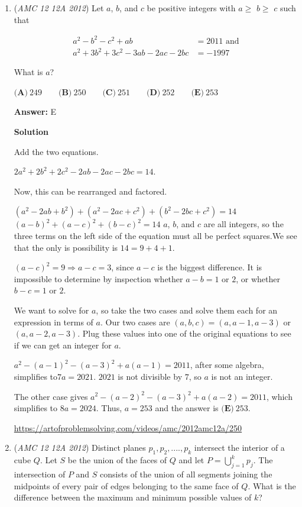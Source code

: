 \begin{enumerate}
	\item (\textit{AMC 12 12A 2012}) Let $a$, $b$, and $c$ be positive integers with $a\ge$ $b\ge$ $c$ such that

 \begin{align*}a^{2}-b^{2}-c^{2}+ab&=2011\text{ and}\\ a^{2}+3b^{2}+3c^{2}-3ab-2ac-2bc&=-1997 \end{align*}

What is $a$?


 $\textbf{(A)}\ 249\qquad\textbf{(B)}\ 250\qquad\textbf{(C)}\ 251\qquad\textbf{(D)}\ 252\qquad\textbf{(E)}\ 253$

 \textbf{Answer: }E



\textbf{Solution}

Add the two equations.

 $2a^2 + 2b^2 + 2c^2 - 2ab - 2ac - 2bc = 14$.

 Now, this can be rearranged and factored.

 $(a^2 - 2ab + b^2) + (a^2 - 2ac + c^2) + (b^2 - 2bc + c^2) = 14$
$(a - b)^2 + (a - c)^2 + (b - c)^2 = 14$
$a$, $b$, and $c$ are all integers, so the three terms on the left side of the equation must all be perfect squares.We see that the only is possibility is $14 = 9 + 4 + 1$. 

 $(a-c)^2 = 9 \Rightarrow a-c = 3$, since $a-c$ is the biggest difference. It is impossible to determine by inspection whether $a-b = 1$ or $2$, or whether $b-c = 1$ or $2$.

 We want to solve for $a$, so take the two cases and solve them each for an expression in terms of $a$. Our two cases are $(a, b, c) = (a, a-1, a-3)$ or $(a, a-2, a-3)$. Plug these values into one of the original equations to see if we can get an integer for $a$.

 $a^2 - (a-1)^2 - (a-3)^2 + a(a-1) = 2011$, after some algebra, simplifies to$7a = 2021$. $2021$ is not divisible by $7$, so $a$ is not an integer. 

 The other case gives $a^2 - (a-2)^2 - (a-3)^2 + a(a-2) = 2011$, which simplifies to $8a = 2024$. Thus, $a = 253$ and the answer is $\boxed{\textbf{(E)}\ 253}$.

 \href{https://artofproblemsolving.com/videos/amc/2012amc12a/250}{https://artofproblemsolving.com/videos/amc/2012amc12a/250}

 


	\item (\textit{AMC 12 12A 2012}) Distinct planes $p_1,p_2,....,p_k$ intersect the interior of a cube $Q$. Let $S$ be the union of the faces of $Q$ and let $P =\bigcup_{j=1}^{k}p_{j}$. The intersection of $P$ and $S$ consists of the union of all segments joining the midpoints of every pair of edges belonging to the same face of $Q$. What is the difference between the maximum and minimum possible values of $k$?



\end{enumerate}
